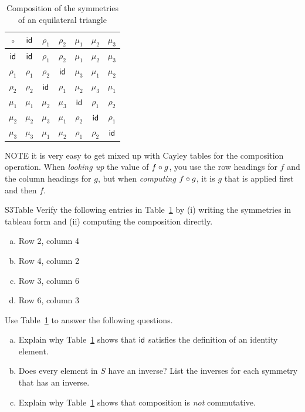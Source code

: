 \begin{table}
{\small
\begin{center}
\begin{tabular}{c|cccccc}
$\circ$  & ${\sf{i}d}$     & $\rho_1$ & $\rho_2$ & $\mu_1$ & $\mu_2$ & $\mu_3$ \\
\hline
${\sf{i}d}$     & ${\sf{i}d}$     & $\rho_1$ & $\rho_2$ & $\mu_1$ & $\mu_2$ & $\mu_3$ \\
$\rho_1$ & $\rho_1$ & $\rho_2$ & ${\sf{i}d}$     & $\mu_3$ & $\mu_1$ & $\mu_2$ \\
$\rho_2$ & $\rho_2$ & ${\sf{i}d}$     & $\rho_1$ & $\mu_2$ & $\mu_3$ & $\mu_1$ \\
$\mu_1$  & $\mu_1$  & $\mu_2$  & $\mu_3$  & ${\sf{i}d}$    & $\rho_1$& $\rho_2$\\
$\mu_2$  & $\mu_2$  & $\mu_3$  & $\mu_1$  & $\rho_2$& ${\sf{i}d}$    & $\rho_1$\\
$\mu_3$  & $\mu_3$  & $\mu_1$  & $\mu_2$  & $\rho_1$& $\rho_2$& ${\sf{i}d}$
\end{tabular}
\end{center}
}
\caption{Composition of the symmetries of an equilateral triangle}
\label{S3_table}
\end{table}

\begin{rem}
NOTE it is very easy to get mixed up with Cayley tables for the composition operation. When \emph{looking up} the value of $f \circ g$, you use the row headings for $f$ and the column headings for  $g$, but when \emph{computing} $f \circ g$, it is $g$ that is applied first and then $f$.
\end{rem}

\begin{exercise}{S3Table}
Verify the following entries in Table~\ref{S3_table} by (i) writing the symmetries in tableau form and (ii) computing the composition directly.
\begin{enumerate}[(a)]
\item
Row 2, column 4
\item
Row 4, column 2
\item
Row 3, column 6
\item
Row 6, column 3
\end{enumerate}
\end{exercise}

\begin{exercise}{20}
Use Table~\ref{S3_table} to answer the following questions. 
\begin{enumerate}[(a)]
\item
Explain why Table~\ref{S3_table} shows that ${\sf{i}d}$ satisfies the definition of an identity element.
\item
Does every element in $S$ have an inverse?  List the inverses for each symmetry that has an inverse.
\item
Explain why Table~\ref{S3_table} shows that composition is \emph{not} commutative.
\end{enumerate}
\end{exercise}

